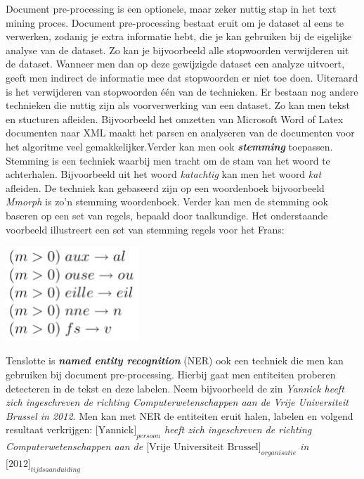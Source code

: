 Document pre-processing is een optionele, maar zeker nuttig stap in het text mining proces. Document pre-processing bestaat eruit om je dataset al eens te verwerken, zodanig je extra informatie hebt, die je kan gebruiken bij de eigelijke analyse van de dataset. Zo kan je bijvoorbeeld alle stopwoorden verwijderen uit de dataset. Wanneer men dan op deze gewijzigde dataset een analyze uitvoert, geeft men indirect de informatie mee dat stopwoorden er niet toe doen. Uiteraard is het verwijderen van stopwoorden \'e\'en van de technieken.  Er bestaan nog andere technieken die nuttig zijn als voorverwerking van een dataset. Zo kan men tekst en stucturen afleiden. Bijvoorbeeld het omzetten van Microsoft Word of Latex documenten naar XML maakt het parsen en analyseren van de documenten voor het algoritme veel gemakkelijker.Verder kan men ook \textbf{\textit{stemming}} toepassen. Stemming is een techniek waarbij men tracht om de stam van het woord te achterhalen. Bijvoorbeeld uit het woord \textit{katachtig} kan men het woord \textit{kat} afleiden. De techniek kan gebaseerd zijn op een woordenboek bijvoorbeeld \textit{Mmorph} \cite{petitpierre1995mmorph} is zo'n stemming woordenboek. Verder kan men de stemming ook baseren op een set van regels, bepaald door taalkundige. Het onderstaande voorbeeld illustreert een set van stemming regels voor het Frans: \\
\begin{center}
  \includegraphics[width=5cm]{stemming_regels_frans}
\end{center}
Tenslotte is \textbf{\textit{named entity recognition}} (NER) ook een techniek die men kan gebruiken bij document pre-processing. Hierbij gaat men entiteiten proberen detecteren in de tekst en deze labelen. Neem bijvoorbeeld de zin \textit{Yannick heeft zich ingeschreven de richting Computerwetenschappen aan de Vrije Universiteit Brussel in 2012}. Men kan met NER de entiteiten eruit halen, labelen en volgend resultaat verkrijgen: \textit{$\text{[Yannick]}_{persoon}$ heeft zich ingeschreven de richting Computerwetenschappen aan de $\text{[Vrije Universiteit Brussel]}_{organisatie}$ in $\text{[2012]}_{tijdsaanduiding}$}
